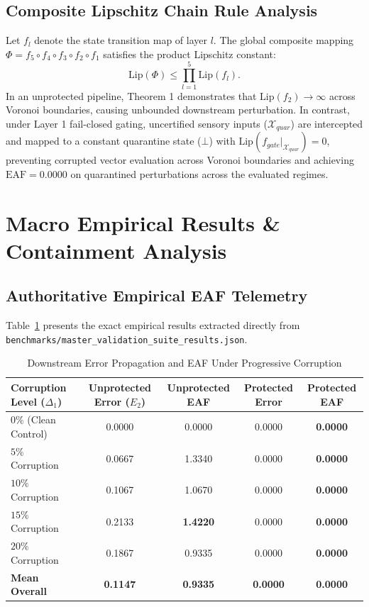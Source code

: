 \documentclass[conference]{IEEEtran}
\begin{document}
\subsection{Composite Lipschitz Chain Rule Analysis}
Let $f_l$ denote the state transition map of layer $l$. The global composite mapping $\Phi = f_5 \circ f_4 \circ f_3 \circ f_2 \circ f_1$ satisfies the product Lipschitz constant:
\begin{equation}
\mathrm{Lip}(\Phi) \le \prod_{l=1}^5 \mathrm{Lip}(f_l).
\end{equation}
In an unprotected pipeline, Theorem 1 demonstrates that $\mathrm{Lip}(f_2) \to \infty$ across Voronoi boundaries, causing unbounded downstream perturbation. In contrast, under Layer 1 fail-closed gating, uncertified sensory inputs ($\mathcal{X}_{quar}$) are intercepted and mapped to a constant quarantine state ($\bot$) with $\mathrm{Lip}(f_{gate}|_{\mathcal{X}_{quar}}) = 0$, preventing corrupted vector evaluation across Voronoi boundaries and achieving $\mathrm{EAF} = 0.0000$ on quarantined perturbations across the evaluated regimes.

\section{Macro Empirical Results \& Containment Analysis}
\subsection{Authoritative Empirical EAF Telemetry}
Table~\ref{tab:eaf_telemetry} presents the exact empirical results extracted directly from \texttt{benchmarks/master\_validation\_suite\_results.json}.

\begin{table}[t]
\centering
\caption{Downstream Error Propagation and EAF Under Progressive Corruption}
\label{tab:eaf_telemetry}
\begin{tabular}{@{}lcccc@{}}
\toprule
\textbf{Corruption Level ($\Delta_1$)} & \textbf{Unprotected Error ($E_2$)} & \textbf{Unprotected EAF} & \textbf{Protected Error} & \textbf{Protected EAF} \\ \midrule
$0\%$ (Clean Control) & 0.0000 & 0.0000 & 0.0000 & \textbf{0.0000} \\
$5\%$ Corruption & 0.0667 & 1.3340 & 0.0000 & \textbf{0.0000} \\
$10\%$ Corruption & 0.1067 & 1.0670 & 0.0000 & \textbf{0.0000} \\
$15\%$ Corruption & 0.2133 & \textbf{1.4220} & 0.0000 & \textbf{0.0000} \\
$20\%$ Corruption & 0.1867 & 0.9335 & 0.0000 & \textbf{0.0000} \\ \midrule
\textbf{Mean Overall} & \textbf{0.1147} & \textbf{0.9335} & \textbf{0.0000} & \textbf{0.0000} \\ \bottomrule
\end{tabular}
\end{table}
\end{document}
